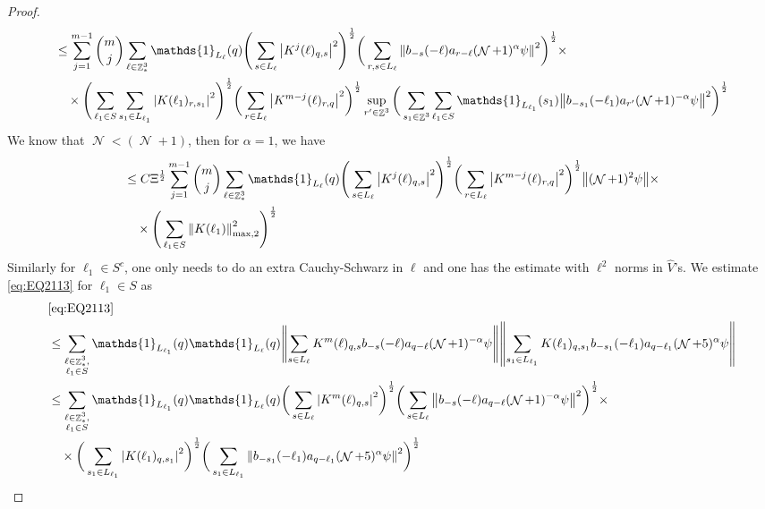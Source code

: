 \documentclass[12pt,a4paper]{article}
\numberwithin{equation}{section}
\newcommand{\1}{\mathbb{I}}
\DeclareMathOperator{\Z}{\mathbb{Z}}
\DeclareMathOperator{\NN}{\mathcal{N}}
\newcommand{\half}{\frac{1}{2}}
\newcommand{\normmaxii}[1]{\norm{#1}_{\mathrm{max,2}}}
\theoremstyle{plain}
\theoremstyle{definition}
\theoremstyle{remark}
\theoremstyle{plain}
\theoremstyle{definition}
\theoremstyle{remark}
\begin{document}
\begin{proof}
\begin{alignat}{2}
	&\leq \sum\limits_{j=1}^{m-1} {{m}\choose j} \sum\limits_{\ell \in \Z^3_*} \mathds{1}_{L_{\ell}}(q) 
	\Bigg( \sum\limits_{s \in L_\ell} \abs{K^{j}(\ell)_{q,s}}^2\Bigg)^\half \bigg( \sum\limits_{r,s \in L_\ell}\norm{  b_{-s}(-\ell) a_{r-\ell} (\NN+1)^{\alpha}\psi}^2\bigg)^\half \times\nonumber\\ &\quad\times \Bigg(\sum\limits_{\ell_1 \in S} \sum\limits_{s_1 \in L_{\ell_1}}\abs{K(\ell_1)_{r,s_1}}^2\Bigg)^\half \bigg(\sum\limits_{r \in L_{\ell}}\abs{ K^{m-j}(\ell)_{r,q}  }^2\bigg)^\half \sup_{r' \in \Z^3}\bigg(\sum\limits_{s_1 \in \Z^3} \sum\limits_{\ell_1 \in S}\mathds{1}_{L_{\ell_1}}(s_1) \norm{ b_{-s_1}(-\ell_1)  a_{r'} (\NN+1)^{-\alpha}\psi }^2\bigg)^\half\nonumber\\ 
	\end{alignat}
	We know that $\NN<(\NN+1)$, then for $\alpha = 1$, we have
	\begin{alignat}{2}
	&\leq C \Xi^\half \sum\limits_{j=1}^{m-1} {{m}\choose j} \sum\limits_{\ell \in \Z^3_*} \mathds{1}_{L_{\ell}}(q) 
	\Bigg( \sum\limits_{s \in L_\ell} \abs{K^{j}(\ell)_{q,s}}^2\Bigg)^\half \bigg(\sum\limits_{r \in L_{\ell}}\abs{ K^{m-j}(\ell)_{r,q}  }^2\bigg)^\half\norm{  (\NN+1)^{2}\psi} \times\nonumber\\ &\quad\times \Bigg(\sum\limits_{\ell_1 \in S} \normmaxii{K(\ell_1)}^2\Bigg)^\half \nonumber\\ \label{eq:estEQ2112}
	\end{alignat}
Similarly for $\ell_1 \in S^c$, one only needs to do an extra Cauchy-Schwarz in $\ell$ and one has the estimate with $\ell^2$ norms in $\hat{V}$'s.\newline 
	We estimate \eqref{eq:EQ2113} for $\ell_1 \in S$ as
	\begin{align}
		&\eqref{eq:EQ2113}\nonumber\\
		&\leq\sum\limits_{\substack{\ell\in \Z^3_*,\\ \ell_1\in S}} \mathds{1}_{L_{\ell_1}}(q) \mathds{1}_{L_{\ell}}(q)  \norm{ \sum\limits_{s\in L_{\ell}} K^m(\ell)_{q,s} b_{-s}(-\ell) a_{q-\ell}(\NN+1)^{-\alpha}\psi}\norm{ \sum\limits_{s_1 \in L_{\ell_1}} K(\ell_1)_{q,s_1} b_{-s_1}(-\ell_1)a_{q-\ell_1} (\NN+5)^{\alpha} \psi }\nonumber\\
		&\leq\sum\limits_{\substack{\ell\in \Z^3_*,\\ \ell_1\in S}} \mathds{1}_{L_{\ell_1}}(q) \mathds{1}_{L_{\ell}}(q)  \bigg(\sum\limits_{s\in L_{\ell}}\abs{  K^m(\ell)_{q,s}}^2 \bigg)^\half \bigg(\sum\limits_{s\in L_{\ell}}\norm{   b_{-s}(-\ell) a_{q-\ell}(\NN+1)^{-\alpha}\psi}^2\bigg)^\half \times \\ &\quad \times\bigg(\sum\limits_{s_1\in L_{\ell_1}}\abs{  K(\ell_1)_{q,s_1}}^2 \bigg)^\half \bigg(\sum\limits_{s_1 \in L_{\ell_1}}\norm{ b_{-s_1}(-\ell_1)a_{q-\ell_1} (\NN+5)^{\alpha} \psi }^2\bigg)^\half\nonumber\\

\end{align}
\end{proof}
\end{document}
